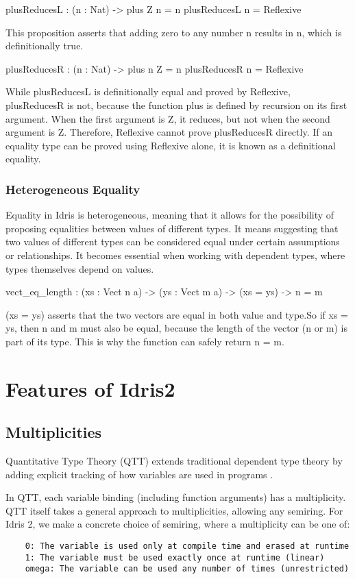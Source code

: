 \documentclass[]{rptuseminar}
\begin{document}
\begin{idris}
    plusReducesL : (n : Nat) -> plus Z n = n
    plusReducesL n = Reflexive
\end{idris}
This proposition asserts that adding zero to any number n results in n, which is definitionally true.
\begin{idris}
    plusReducesR : (n : Nat) -> plus n Z = n
    plusReducesR n = Reflexive
\end{idris}
While plusReducesL is definitionally equal and proved by Reflexive, plusReducesR is not, because the function plus is defined by recursion on its first argument. When the first argument is Z, it reduces, but not when the second argument is Z. Therefore, Reflexive cannot prove plusReducesR directly.
If an equality type can be proved using Reflexive alone, it is known as a definitional equality.
\subsubsection{Heterogeneous Equality}
Equality in Idris is heterogeneous, meaning that it allows for the possibility of proposing equalities between values of different types. It means suggesting that two values of different types can be considered equal under certain assumptions or relationships. It becomes essential when working with dependent types, where types themselves depend on values.
\begin{idris}
    vect_eq_length : (xs : Vect n a) -> (ys : Vect m a) ->
    (xs = ys) -> n = m 
\end{idris}
(xs = ys) asserts that the two vectors are equal in both value and type.So if xs = ys, then n and m must also be equal, because the length of the vector (n or m) is part of its type. This is why the function can safely return n = m.
\section{Features of Idris2}  
\label{sec:features}
\subsection{Multiplicities}
Quantitative Type Theory (QTT) extends traditional dependent type theory by adding explicit tracking of how variables are used in programs \cite{atkey2018syntax}. 

In QTT, each variable binding (including function arguments)
has a multiplicity. QTT itself takes a general approach to multiplicities, allowing any semiring.
For Idris 2, we make a concrete choice of semiring, where a multiplicity can be one of:
\begin{lstlisting}
    0: The variable is used only at compile time and erased at runtime
    1: The variable must be used exactly once at runtime (linear)
    omega: The variable can be used any number of times (unrestricted)
\end{lstlisting}
\end{document}
